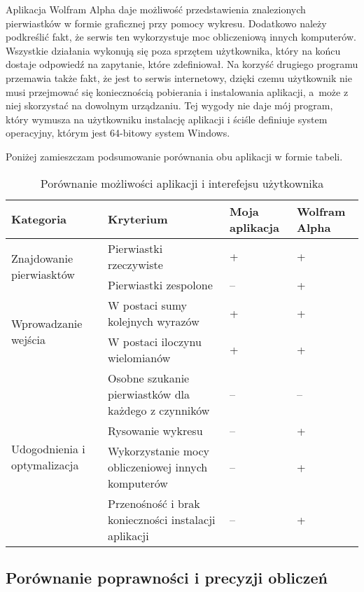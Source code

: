 Aplikacja Wolfram Alpha daje możliwość przedstawienia znalezionych pierwiastków w formie graficznej przy pomocy wykresu. Dodatkowo należy podkreślić fakt, że serwis ten wykorzystuje moc obliczeniową innych komputerów. Wszystkie działania wykonują się poza sprzętem użytkownika, który na końcu dostaje odpowiedź na zapytanie, które zdefiniował. Na korzyść drugiego programu przemawia także fakt, że jest to serwis internetowy, dzięki czemu użytkownik nie musi przejmować się koniecznością pobierania i instalowania aplikacji, a~może z niej skorzystać na dowolnym urządzaniu. Tej wygody nie daje mój program, który wymusza na użytkowniku instalację aplikacji i ściśle definiuje system operacyjny, którym jest 64-bitowy system Windows.

Poniżej zamieszczam podsumowanie porównania obu aplikacji w formie tabeli.

\begin{table}[H]
	\begin{tabular}{ |p{4.7cm}|p{5.5cm}|p{1.5cm}|p{1.5cm}| } 
		\hline
		Kategoria & Kryterium & Moja aplikacja & Wolfram Alpha \\
		\hline
		\multirow{2}{*}{Znajdowanie pierwiasktów}
		& Pierwiastki rzeczywiste & + & + \\
		& Pierwiastki zespolone & -- & + \\
		\hline
		\multirow{2}{*}{Wprowadzanie wejścia}
		&W postaci sumy kolejnych wyrazów & + & + \\
		&W postaci iloczynu wielomianów & + & + \\
		\hline
		\multirow{4}{*}{Udogodnienia i optymalizacja}
		&Osobne szukanie pierwiastków dla każdego z czynników & -- & -- \\
		&Rysowanie wykresu & -- & + \\
		&Wykorzystanie mocy obliczeniowej innych komputerów & -- & + \\
		&Przenośność i brak konieczności instalacji aplikacji & -- & + \\
		\hline
	\end{tabular}
	\caption{Porównanie możliwości aplikacji i interefejsu użytkownika}
\end{table}

\subsection {Porównanie poprawności i precyzji obliczeń}

